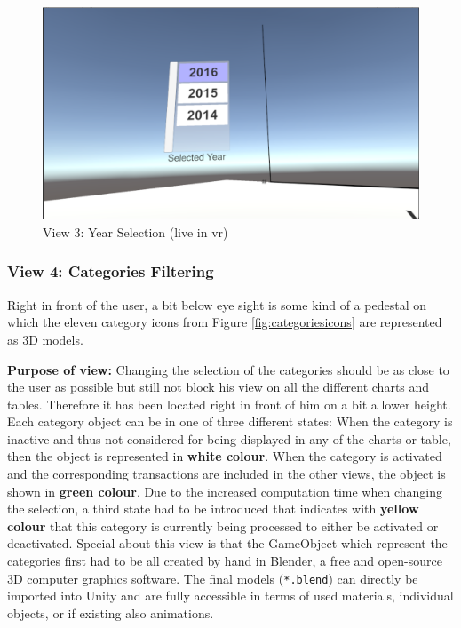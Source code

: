 \begin{figure}[h]
	\begin{center}
		\includegraphics[width=12cm]{03_Figures/08_Development/View3_YearSelection.png}
		\caption{View 3: Year Selection (live in \gls{vr})}
		\label{fig:unityview3}
	\end{center}
\end{figure}


\subsubsection{View 4: Categories Filtering}

Right in front of the user, a bit below eye sight is some kind of a pedestal on which the eleven category icons from Figure \ref{fig:categoriesicons} are represented as 3D models. 

\textbf{Purpose of view:} Changing the selection of the categories should be as close to the user as possible but still not block his view on all the different charts and tables. Therefore it has been located right in front of him on a bit a lower height. Each category object can be in one of three different states: When the category is inactive and thus not considered for being displayed in any of the charts or table, then the object is represented in \textbf{white colour}. When the category is activated and the corresponding transactions are included in the other views, the object is shown in \textbf{green colour}. Due to the increased computation time when changing the selection, a third state had to be introduced that indicates with \textbf{yellow colour} that this category is currently being processed to either be activated or deactivated. \newline
Special about this view is that the GameObject which represent the categories first had to be all created by hand in Blender, a free and open-source 3D computer graphics software. The final models (\texttt{*.blend}) can directly be imported into Unity and are fully accessible in terms of used materials, individual objects, or if existing also animations.

